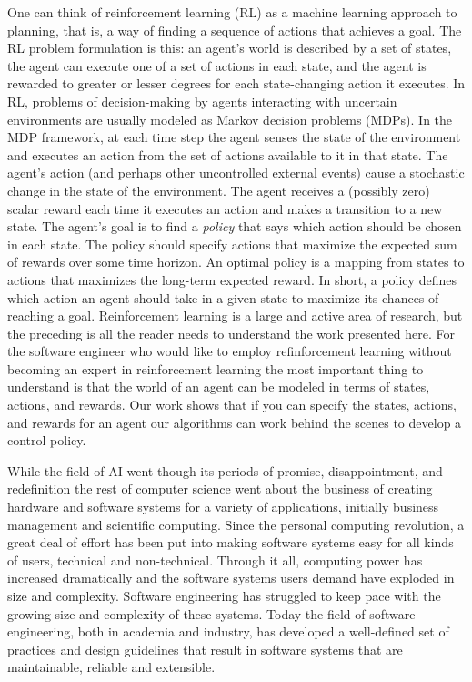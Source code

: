 One can think of reinforcement learning (RL) as a machine learning approach to planning, that is, a way of finding a sequence of actions that achieves a goal.  The RL problem formulation is this: an agent's world is described by a set of states, the agent can execute one of a set of actions in each state, and the agent is rewarded to greater or lesser degrees for each state-changing action it executes. In RL, problems of decision-making by agents interacting with uncertain environments are usually modeled as Markov decision problems (MDPs). In the MDP framework, at each time step the agent senses the state of the environment and executes an action from the set of actions available to it in that state. The agent's action (and perhaps other uncontrolled external events) cause a stochastic change in the state of the environment. The agent receives a (possibly zero) scalar reward each time it executes an action and makes a transition to a new state. The agent's goal is to find a {\it policy} that says which action should be chosen in each state.  The policy should specify actions that maximize the expected sum of rewards over some time horizon. An optimal policy is a mapping from states to actions that maximizes the long-term expected reward.  In short, a policy defines which action an agent should take in a given state to maximize its chances of reaching a goal.  Reinforcement learning is a large and active area of research, but the preceding is all the reader needs to understand the work presented here. For the software engineer who would like to employ refinforcement learning without becoming an expert in reinforcement learning the most important thing to understand is that the world of an agent can be modeled in terms of states, actions, and rewards. Our work shows that if you can specify the states, actions, and rewards for an agent our algorithms can work behind the scenes to develop a control policy.

While the field of AI went though its periods of promise, disappointment, and redefinition the rest of computer science went about the business of creating hardware and software systems for a variety of applications, initially business management and scientific computing.  Since the personal computing revolution, a great deal of effort has been put into making software systems easy for all kinds of users, technical and non-technical.  Through it all, computing power has increased dramatically and the software systems users demand have exploded in size and complexity.  Software engineering has struggled to keep pace with the growing size and complexity of these systems. Today the field of software engineering, both in academia and industry, has developed a well-defined set of practices and design guidelines that result in software systems that are maintainable, reliable and extensible.

